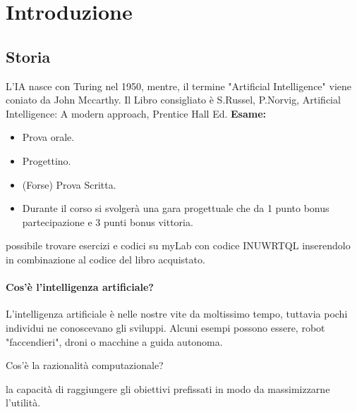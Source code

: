 \chapter{Introduzione}
\section{Storia}
L'IA nasce con Turing nel 1950, mentre, il termine "Artificial Intelligence" viene coniato da John Mccarthy. 
\newline
Il Libro consigliato è S.Russel, P.Norvig, Artificial Intelligence: A modern approach, Prentice Hall Ed.
\newline
\textbf{Esame:}
\begin{itemize}
    \item Prova orale.
    \item Progettino.
    \item (Forse) Prova Scritta.
    \item Durante il corso si svolgerà una gara progettuale che da 1 punto bonus partecipazione e 3 punti bonus vittoria.
\end{itemize}
 possibile trovare esercizi e codici su myLab con codice INUWRTQL inserendolo in combinazione al codice del libro acquistato.
\subsubsection{Cos'è l'intelligenza artificiale?}
L'intelligenza artificiale è nelle nostre vite da moltissimo tempo, tuttavia pochi individui ne conoscevano gli sviluppi.
Alcuni esempi possono essere, robot "faccendieri", droni o macchine a guida autonoma.

\newpage
Cos'è la razionalità computazionale? 
\begin{definition}
     la capacità di raggiungere gli obiettivi prefissati in modo da massimizzarne l'utilità.
\end{definition}
